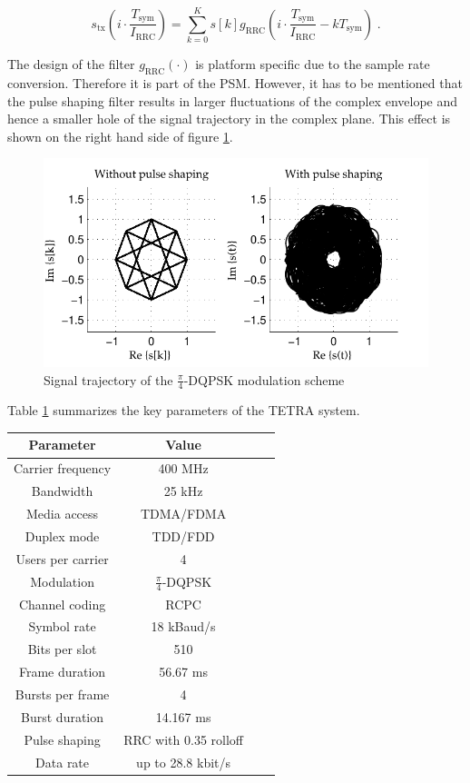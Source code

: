 \begin{equation}
s_\text{tx}\left(i \cdot \frac{T_\text{sym}}{I_\text{RRC}}\right)  = \sum_{k=0}^{K}{s[k]g_{\text{RRC}}\left(i \cdot \frac{T_\text{sym}}{I_\text{RRC}}-kT_\text{sym}\right)}\;.
\end{equation}

The design of the filter $g_\text{RRC}(\cdot)$ is platform specific due to the sample rate conversion. Therefore it is part of the \ac{PSM}. However, it has to be mentioned that the pulse shaping filter results in larger fluctuations of the complex envelope and hence a smaller hole of the signal trajectory in the complex plane. This effect is shown on the right hand side of figure \ref{fig:sig_const}.

\begin{figure}[htb]
	\centering
		\includegraphics[width=1.00\textwidth]{../kapitel04/figures/sig_const.pdf}
	\caption{Signal trajectory of the $\frac{\pi}{4}$-DQPSK modulation scheme}
	\label{fig:sig_const}
\end{figure}

Table \ref{table:TETRA_overview} summarizes the key parameters of the TETRA system.

\begin{table}[htb]
\label{table:TETRA_overview}
	\centering\begin{tabular}{cccc}
	\toprule
	Parameter					& Value \\
	\midrule
	Carrier frequency	& 400 MHz	 \\
	Bandwidth					& 25 kHz \\
	Media access			& TDMA/FDMA \\
	Duplex mode				& TDD/FDD \\
	Users per carrier	& 4 \\
	Modulation				& $\frac{\pi}{4}$-DQPSK \\
	Channel coding		& RCPC \\
	Symbol rate				& 18 kBaud/s \\
	Bits per slot			& 510 \\
	Frame duration		& 56.67 ms \\
	Bursts per frame	& 4 \\
	Burst duration		& 14.167 ms \\
	Pulse shaping			& RRC with 0.35 rolloff \\
	Data rate					& up to 28.8 kbit/s \\
	\bottomrule
	\end{tabular}
\end{table}

